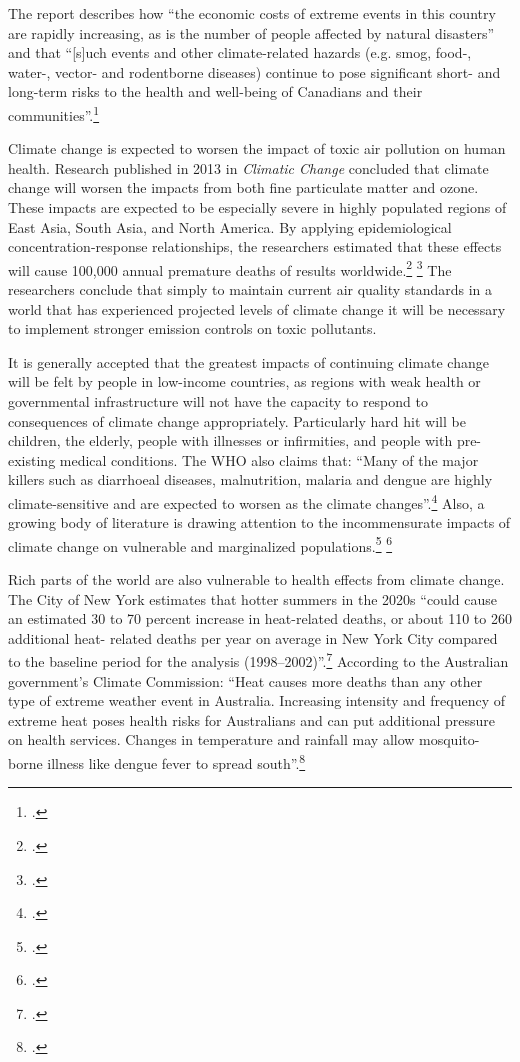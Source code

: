 \documentclass[10pt]{article}
\begin{document}
The report describes how ``the economic costs of extreme events in this country are rapidly increasing, as is the number of people affected by natural disasters'' and that ``[s]uch events and other climate-related hazards (e.g. smog, food-, water-, vector- and rodentborne diseases) continue to pose significant short- and long-term risks to the health and well-being of Canadians and their communities''.\footcite[][p. 432]{HHInACC}



Climate change is expected to worsen the impact of toxic air pollution on human health.
Research published in 2013 in \emph{Climatic Change} concluded that climate change will worsen the impacts from both fine particulate matter and ozone.
These impacts are expected to be especially severe in highly populated regions of East Asia, South Asia, and North America.
By applying epidemiological concentration-response relationships, the researchers estimated that these effects will cause 100,000 annual premature deaths of results worldwide.\footcite[][]{Fang2013} \footcite[See also: ][]{CCAirPollution2013}
The researchers conclude that simply to maintain current air quality standards in a world that has experienced projected levels of climate change it will be necessary to implement stronger emission controls on toxic pollutants.



It is generally accepted that the greatest impacts of continuing climate change will be felt by people in low-income countries, as regions with weak health or governmental infrastructure will not have the capacity to respond to consequences of climate change appropriately. 
Particularly hard hit will be children, the elderly, people with illnesses or infirmities, and people with pre-existing medical conditions. 
The WHO also claims that: ``Many of the major killers such as diarrhoeal diseases, malnutrition, malaria and dengue are highly climate-sensitive and are expected to worsen as the climate changes''.\footcite[][]{WHOCCandHealth2012}
Also, a growing body of literature is drawing attention to the incommensurate impacts of climate change on vulnerable and marginalized populations.\footcite[][p. 1693--1733]{Costello2009} \footcite[][]{WHOSocialDeterm}



Rich parts of the world are also vulnerable to health effects from climate change.
The City of New York estimates that hotter summers in the 2020s ``could cause an estimated 30 to 70 percent increase in heat-related deaths, or about 110 to 260 additional heat- related deaths per year on average in New York City compared to the baseline period for the analysis (1998–2002)''.\footcite[][p. 31]{ResilientNewYork}
According to the Australian government's Climate Commission: ``Heat causes more deaths than any other type of extreme weather event in Australia. Increasing intensity and frequency of extreme heat poses health risks for Australians and can put additional pressure on health services. Changes in temperature and rainfall may allow mosquito-borne illness like dengue fever to spread south''.\footcite[][p. 4]{CriticalDecade2013}
\end{document}
